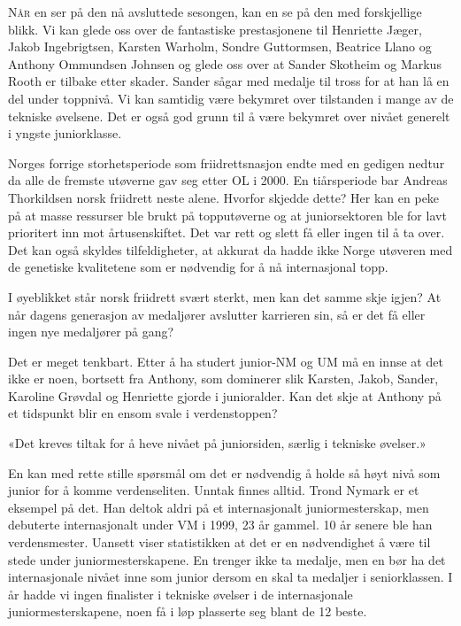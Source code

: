 \gdef\aapnerportrett{blad/bilder/henning_hofstad_kvadrat.jpg}

\lettrine[lines=3]{N}{år} en ser på den nå avsluttede sesongen, kan en se på den med forskjellige blikk. Vi kan glede oss over de fantastiske prestasjonene til Henriette Jæger, Jakob Ingebrigtsen, Karsten Warholm, Sondre Guttormsen, Beatrice Llano og Anthony Ommundsen Johnsen og glede oss over at Sander Skotheim og Markus Rooth er tilbake etter skader. Sander sågar med medalje til tross for at han lå en del under toppnivå. Vi kan samtidig være bekymret over tilstanden i mange av de tekniske øvelsene. Det er også god grunn til å være bekymret over nivået generelt i yngste juniorklasse.

Norges forrige storhetsperiode som friidrettsnasjon endte med en gedigen nedtur da alle de fremste utøverne gav seg etter OL i 2000. En tiårsperiode bar Andreas Thorkildsen norsk friidrett neste alene. Hvorfor skjedde dette? Her kan en peke på at masse ressurser ble brukt på topputøverne og at juniorsektoren ble for lavt prioritert inn mot årtusenskiftet. Det var rett og slett få eller ingen til å ta over. Det kan også skyldes tilfeldigheter, at akkurat da hadde ikke Norge utøveren med de genetiske kvalitetene som er nødvendig for å nå internasjonal topp.

I øyeblikket står norsk friidrett svært sterkt, men kan det samme skje igjen? At når dagens generasjon av medaljører avslutter karrieren sin, så er det få eller ingen nye medaljører på gang?

Det er meget tenkbart. Etter å ha studert junior-NM og UM må en innse at det ikke er noen, bortsett fra Anthony, som dominerer slik Karsten, Jakob, Sander, Karoline Grøvdal og Henriette gjorde i junioralder. Kan det skje at Anthony på et tidspunkt blir en ensom svale i verdenstoppen?

\begin{sitat}

«Det kreves tiltak for å heve nivået på juniorsiden, særlig i tekniske øvelser.»

\end{sitat}

En kan med rette stille spørsmål om det er nødvendig å holde så høyt nivå som junior for å komme verdenseliten. Unntak finnes alltid. Trond Nymark er et eksempel på det. Han deltok aldri på et internasjonalt juniormesterskap, men debuterte internasjonalt under VM i 1999, 23 år gammel. 10 år senere ble han verdensmester. Uansett viser statistikken at det er en nødvendighet å være til stede under juniormesterskapene. En trenger ikke ta medalje, men en bør ha det internasjonale nivået inne som junior dersom en skal ta medaljer i seniorklassen. I år hadde vi ingen finalister i tekniske øvelser i de internasjonale juniormesterskapene, noen få i løp plasserte seg blant de 12 beste.

